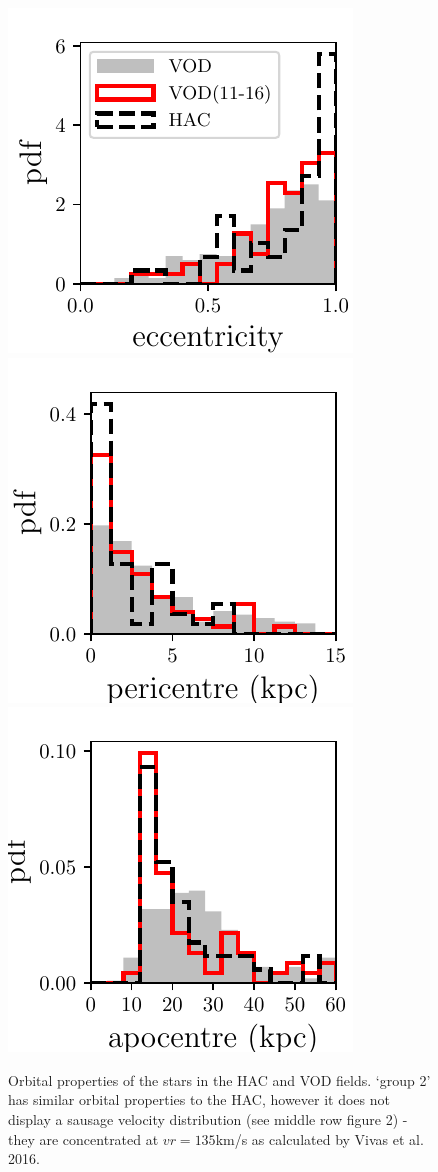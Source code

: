 \documentclass[fleqn,usenatbib]{mnras}
\begin{document}
\begin{figure}
              \includegraphics[scale=0.473]{eccentricities.pdf} 
    \includegraphics[scale=0.473]{pericentres.pdf} 
                          \includegraphics[scale=0.473]{apocentres.pdf} 
\vspace{-0.4cm}
  \caption{ Orbital properties of the stars in the HAC and VOD fields. `group 2' has similar orbital properties to the HAC, however it does not display a sausage velocity distribution (see middle row figure 2) - they are concentrated at $vr =  135 $km/s as calculated by Vivas et al. 2016. }
    \label{fig:orbits}
    
    \end{figure}
\end{document}

